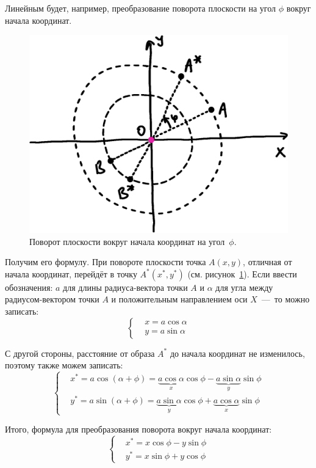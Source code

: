 \documentclass[a4paper,12pt]{article}
\begin{document}
  \begin{example}
    Линейным будет, например, преобразование поворота плоскости на угол $\phi$ вокруг начала координат.
    
    \begin{figure}
      \centering
      
      \includegraphics[width=0.8\columnwidth]{rotate-around-zero-inv}
      
      \caption{Поворот плоскости вокруг начала координат на угол~$\phi$.}
      \label{fig:rotate-around-zero-inv}
    \end{figure}
    
    Получим его формулу.
    При повороте плоскости точка $A(x, y)$, отличная от начала координат, перейдёт в точку $A^*(x^*, y^*)$ (см. рисунок~\ref{fig:rotate-around-zero-inv}).
    Если ввести обозначения: $a$ для длины радиуса-вектора точки $A$ и $\alpha$ для угла между радиусом-вектором точки $A$ и положительным направлением оси $X$~---~то можно записать:
    \[
      \left\{
        \begin{aligned}
          &x = a \cos \alpha\\
          &y = a \sin \alpha
        \end{aligned}
      \right.
    \]
    
    С другой стороны, расстояние от образа $A^*$ до начала координат не изменилось, поэтому также можем записать:
    \[
      \left\{
        \begin{aligned}
          &x^* = a \cos(\alpha + \phi) = \underbrace{a \cos\alpha}_{x} \cos\phi - \underbrace{a \sin\alpha}_{y} \sin\phi\\
          &y^* = a \sin(\alpha + \phi) = \underbrace{a \sin\alpha}_{y} \cos\phi + \underbrace{a \cos\alpha}_{x} \sin\phi
        \end{aligned}
      \right.
    \]
    
    Итого, формула для преобразования поворота вокруг начала координат:
    \begin{equation}\label{eq:rotate-around-zero}
      \boxed{
        \left\{
          \begin{aligned}
            &x^* = x \cos\phi - y \sin\phi\\
            &y^* = x \sin\phi + y \cos\phi
          \end{aligned}
        \right.
      }
    \end{equation}
  \end{example}
  
\end{document}

